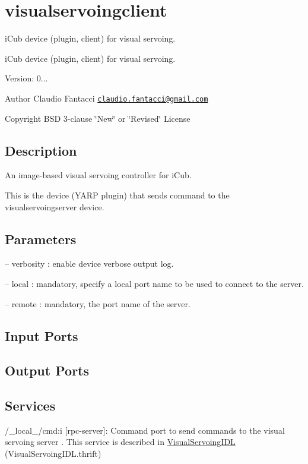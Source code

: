 \hypertarget{group__visualservoingclient}{}\section{visualservoingclient}
\label{group__visualservoingclient}


i\+Cub device (plugin, client) for visual servoing.  


i\+Cub device (plugin, client) for visual servoing. 

Version\+: 0... \begin{DoxyAuthor}{Author}
Claudio Fantacci \href{mailto:claudio.fantacci@gmail.com}{\tt claudio.\+fantacci@gmail.\+com} ~\newline
 
\end{DoxyAuthor}
\begin{DoxyCopyright}{Copyright}
B\+SD 3-\/clause \char`\"{}\+New\char`\"{} or \char`\"{}\+Revised\char`\"{} License 
\end{DoxyCopyright}
\hypertarget{group__visualservoingserver_intro_sec}{}\subsection{Description}\label{group__visualservoingserver_intro_sec}
An image-\/based visual servoing controller for i\+Cub.

This is the device (Y\+A\+RP plugin) that sends command to the visualservoingserver device.\hypertarget{group__visualservoingserver_parameters_sec}{}\subsection{Parameters}\label{group__visualservoingserver_parameters_sec}

\begin{DoxyItemize}
\item -- verbosity \+: enable device verbose output log.
\item -- local \+: mandatory, specify a local port name to be used to connect to the server.
\item -- remote \+: mandatory, the port name of the server. 
\end{DoxyItemize}\hypertarget{group__visualservoingserver_inputports_sec}{}\subsection{Input Ports}\label{group__visualservoingserver_inputports_sec}
\hypertarget{group__visualservoingserver_outputports_sec}{}\subsection{Output Ports}\label{group__visualservoingserver_outputports_sec}
\hypertarget{group__visualservoingserver_services_sec}{}\subsection{Services}\label{group__visualservoingserver_services_sec}

\begin{DoxyItemize}
\item /\+\_\+local\+\_\+/cmd\+:i \mbox{[}rpc-\/server\mbox{]}\+: Command port to send commands to the visual servoing server . This service is described in \hyperlink{classVisualServoingIDL}{Visual\+Servoing\+I\+DL} (Visual\+Servoing\+I\+D\+L.\+thrift) 
\end{DoxyItemize}